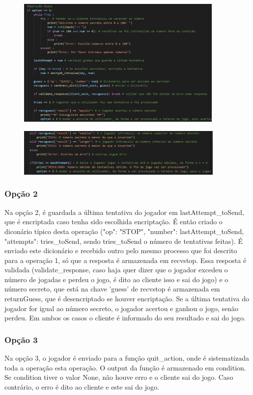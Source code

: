 \documentclass{report}
\begin{document}
\begin{figure}[!h]
\center
\includegraphics[height = 180pt]{img/option1.png}
\end{figure}
\begin{figure}[!h]
\center
\includegraphics[height = 67pt]{img/opt1sec.png}
\end{figure}
\subsubsection{Opção 2}
\label{sssec:second}

Na opção 2, é guardada a última tentativa do jogador em lastAttempt\_toSend, que é encriptada caso tenha sido escolhida encriptação.
É então criado o diconário típico desta operação ({"op": "STOP", "number": lastAttempt\_toSend, "attempts": tries\_toSend}, sendo
tries\_toSend o número de tentativas feitas). É enviado este dicionário e recebido outro pelo mesmo processo que foi descrito para
a operação 1, só que a resposta é armazenada em recvstop. Essa resposta é validada (validate\_response, caso haja quer dizer que
o jogador excedeu o número de jogadas e perdeu o jogo, é dito ao cliente isso e sai do jogo)
e o número secreto, que está na chave 'guess' de recvstop é armazenada em returnGuess, que é desencriptado se houver encriptação.
Se a última tentativa do jogador for igual ao número secreto, o jogador acertou e ganhou o jogo, senão perdeu. Em ambos os casos
o cliente é informado do seu resultado e sai do jogo.

\subsubsection{Opção 3}
\label{sssec:third}
Na opção 3, o jogador é enviado para a função quit\_action, onde é sistematizada toda a operação esta operação. O output da função
é armazenado em condition. Se condition tiver o valor None, não houve erro e o cliente sai do jogo. Caso contrário, o erro é
dito ao cliente e este sai do jogo.
\end{document}
